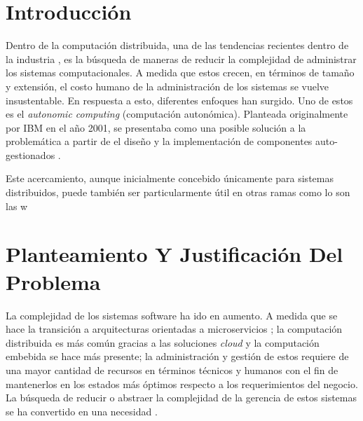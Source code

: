 \documentclass[12pt]{article}
\begin{document}
    
    
    \section{Introducción}


    Dentro de la computación distribuida, una de las tendencias recientes dentro de la industria , es la búsqueda de maneras de reducir la complejidad de administrar los sistemas computacionales. A medida que estos crecen, en términos de tamaño y extensión, el costo humano de la administración de los sistemas se vuelve insustentable. En respuesta a esto, diferentes enfoques han surgido. Uno de estos es el \textit{autonomic computing} (computación autonómica). Planteada originalmente por IBM en el año 2001, se presentaba como una posible solución a la problemática a partir de el diseño y la implementación de componentes auto-gestionados \cite{jeff_2011}. 


    Este acercamiento, aunque inicialmente concebido únicamente para sistemas distribuidos, puede también ser particularmente útil en otras ramas como lo son las w


    \section{Planteamiento Y Justificación Del Problema}
    
    La complejidad de los sistemas software ha ido en aumento. A medida que se hace la transición a arquitecturas orientadas a microservicios \cite{forrester_research_2019}; la computación distribuida es más común gracias a las soluciones \textit{cloud} \cite{the_cloud_in_2021} y la computación embebida se hace más presente;  la administración y gestión de estos requiere de una mayor cantidad de recursos en términos técnicos y humanos con el fin de mantenerlos en los estados más óptimos respecto a los requerimientos del negocio. La búsqueda de reducir o abstraer la complejidad de la gerencia de estos sistemas se ha convertido en una necesidad \cite{lalanda_diaconescu_mccann_2014}.
    
\end{document}
